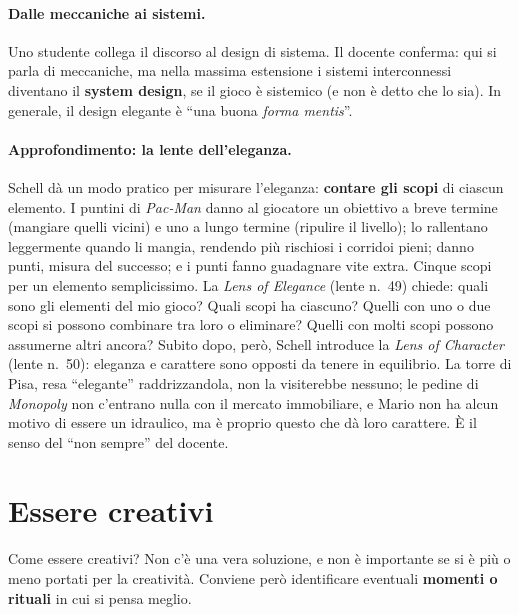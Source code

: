 \paragraph{Dalle meccaniche ai sistemi.} Uno studente collega il discorso al
design di sistema. Il docente conferma: qui si parla di meccaniche, ma nella
massima estensione i sistemi interconnessi diventano il \textbf{system
design}, se il gioco è sistemico (e non è detto che lo sia). In generale, il
design elegante è ``una buona \emph{forma mentis}''.

\paragraph{Approfondimento: la lente dell'eleganza.} Schell dà un modo pratico
per misurare l'eleganza: \textbf{contare gli scopi} di ciascun elemento. I
puntini di \emph{Pac-Man} danno al giocatore un obiettivo a breve termine
(mangiare quelli vicini) e uno a lungo termine (ripulire il livello); lo
rallentano leggermente quando li mangia, rendendo più rischiosi i corridoi
pieni; danno punti, misura del successo; e i punti fanno guadagnare vite
extra. Cinque scopi per un elemento semplicissimo. La \emph{Lens of Elegance}
(lente n.~49) chiede: quali sono gli elementi del mio gioco? Quali scopi ha
ciascuno? Quelli con uno o due scopi si possono combinare tra loro o
eliminare? Quelli con molti scopi possono assumerne altri ancora? Subito
dopo, però, Schell introduce la \emph{Lens of Character} (lente n.~50):
eleganza e carattere sono opposti da tenere in equilibrio. La torre di Pisa,
resa ``elegante'' raddrizzandola, non la visiterebbe nessuno; le pedine di
\emph{Monopoly} non c'entrano nulla con il mercato immobiliare, e Mario non ha
alcun motivo di essere un idraulico, ma è proprio questo che dà loro
carattere. È il senso del ``non sempre'' del docente.

\section{Essere creativi}
\label{sec:creativita}



Come essere creativi? Non c'è una vera soluzione, e non è importante se si è
più o meno portati per la creatività. Conviene però identificare eventuali
\textbf{momenti o rituali} in cui si pensa meglio.

